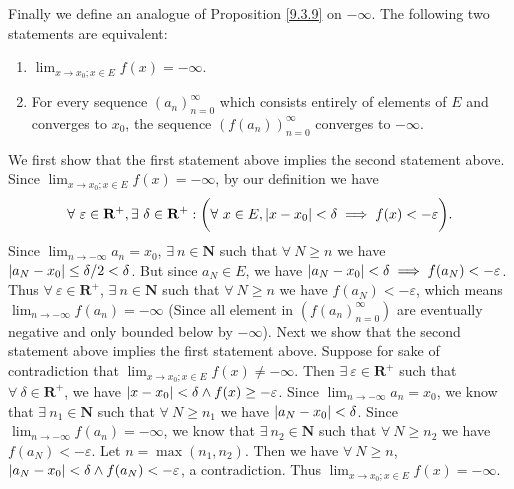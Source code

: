 \begin{definition}
    Finally we define an analogue of Proposition \ref{9.3.9} on \(-\infty\).
    The following two statements are equivalent:
    \begin{enumerate}
        \item \(\lim_{x \to x_0 ; x \in E} f(x) = -\infty\).
        \item For every sequence \((a_n)_{n = 0}^\infty\) which consists entirely of elements of \(E\) and converges to \(x_0\), the sequence \((f(a_n))_{n = 0}^\infty\) converges to \(-\infty\).
    \end{enumerate}
    We first show that the first statement above implies the second statement above.
    Since \(\lim_{x \to x_0 ; x \in E} f(x) = -\infty\), by our definition we have
    \[
        \forall\ \varepsilon \in \mathbf{R}^+, \exists\ \delta \in \mathbf{R}^+ : \bigg(\forall\ x \in E, \abs*{x - x_0} < \delta \implies f(x) < -\varepsilon\bigg).
    \]
    Since \(\lim_{n \to -\infty} a_n = x_0\), \(\exists\ n \in \mathbf{N}\) such that \(\forall\ N \geq n\) we have \(\abs*{a_N - x_0} \leq \delta / 2 < \delta\).
    But since \(a_N \in E\), we have \(\abs*{a_N - x_0} < \delta \implies f(a_N) < -\varepsilon\).
    Thus \(\forall\ \varepsilon \in \mathbf{R}^+\), \(\exists\ n \in \mathbf{N}\) such that \(\forall\ N \geq n\) we have \(f(a_N) < -\varepsilon\), which means \(\lim_{n \to -\infty} f(a_n) = -\infty\)
    (Since all element in \((f(a_n)_{n = 0}^\infty)\) are eventually negative and only bounded below by \(-\infty\)).
    Next we show that the second statement above implies the first statement above.
    Suppose for sake of contradiction that \(\lim_{x \to x_0 ; x \in E} f(x) \neq -\infty\).
    Then \(\exists\ \varepsilon \in \mathbf{R}^+\) such that \(\forall\ \delta \in \mathbf{R}^+\), we have \(\abs*{x - x_0} < \delta \land f(x) \geq -\varepsilon\).
    Since \(\lim_{n \to -\infty} a_n = x_0\), we know that \(\exists\ n_1 \in \mathbf{N}\) such that \(\forall\ N \geq n_1\) we have \(\abs*{a_N - x_0} < \delta\).
    Since \(\lim_{n \to -\infty} f(a_n) = -\infty\), we know that \(\exists\ n_2 \in \mathbf{N}\) such that \(\forall\ N \geq n_2\) we have \(f(a_N) < -\varepsilon\).
    Let \(n = \max(n_1, n_2)\).
    Then we have \(\forall\ N \geq n\), \(\abs*{a_N - x_0} < \delta \land f(a_N) < -\varepsilon\), a contradiction.
    Thus \(\lim_{x \to x_0 ; x \in E} f(x) = -\infty\).
\end{definition}